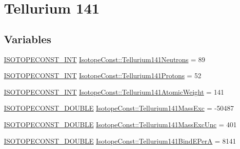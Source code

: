 \hypertarget{group___isotope_const-_tellurium-_te141}{}\section{Tellurium 141}
\label{group___isotope_const-_tellurium-_te141}
\subsection*{Variables}
\begin{DoxyCompactItemize}
\item 
\mbox{\hyperlink{group___isotope_const-_macros_ga5f18360b3e99483a35c32d789e62621c}{I\+S\+O\+T\+O\+P\+E\+C\+O\+N\+S\+T\+\_\+\+I\+NT}} \mbox{\hyperlink{group___isotope_const-_tellurium-_te141_ga329263c221bd4e5d6e7db7a3c4e74d49}{Isotope\+Const\+::\+Tellurium141\+Neutrons}} = 89
\item 
\mbox{\hyperlink{group___isotope_const-_macros_ga5f18360b3e99483a35c32d789e62621c}{I\+S\+O\+T\+O\+P\+E\+C\+O\+N\+S\+T\+\_\+\+I\+NT}} \mbox{\hyperlink{group___isotope_const-_tellurium-_te141_ga631896769483d14cbe433d7431c13224}{Isotope\+Const\+::\+Tellurium141\+Protons}} = 52
\item 
\mbox{\hyperlink{group___isotope_const-_macros_ga5f18360b3e99483a35c32d789e62621c}{I\+S\+O\+T\+O\+P\+E\+C\+O\+N\+S\+T\+\_\+\+I\+NT}} \mbox{\hyperlink{group___isotope_const-_tellurium-_te141_ga7cb351fca498b44522911fde674fb6b2}{Isotope\+Const\+::\+Tellurium141\+Atomic\+Weight}} = 141
\item 
\mbox{\hyperlink{group___isotope_const-_macros_ga8f45a7272ce02c0b4c65c44636ed719a}{I\+S\+O\+T\+O\+P\+E\+C\+O\+N\+S\+T\+\_\+\+D\+O\+U\+B\+LE}} \mbox{\hyperlink{group___isotope_const-_tellurium-_te141_gac84bd58ed0e0b24aa4c090c67a823832}{Isotope\+Const\+::\+Tellurium141\+Mass\+Exc}} = -\/50487
\item 
\mbox{\hyperlink{group___isotope_const-_macros_ga8f45a7272ce02c0b4c65c44636ed719a}{I\+S\+O\+T\+O\+P\+E\+C\+O\+N\+S\+T\+\_\+\+D\+O\+U\+B\+LE}} \mbox{\hyperlink{group___isotope_const-_tellurium-_te141_gad900681373042bf43e4c2dea7a878625}{Isotope\+Const\+::\+Tellurium141\+Mass\+Exc\+Unc}} = 401
\item 
\mbox{\hyperlink{group___isotope_const-_macros_ga8f45a7272ce02c0b4c65c44636ed719a}{I\+S\+O\+T\+O\+P\+E\+C\+O\+N\+S\+T\+\_\+\+D\+O\+U\+B\+LE}} \mbox{\hyperlink{group___isotope_const-_tellurium-_te141_gafdfc3df0796c34f0557564f3c327f123}{Isotope\+Const\+::\+Tellurium141\+Bind\+E\+PerA}} = 8141
\item 

\end{DoxyCompactItemize}
